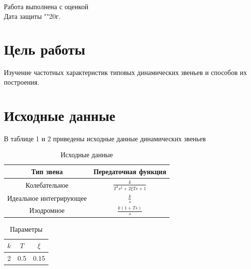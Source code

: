 \documentclass[a4paper, 12pt]{article}
\begin{document}
\begin{titlepage}
		Работа выполнена с оценкой \hspace{0.5cm} \underline{\hspace{10cm}} \\ 
		\vspace{1cm}
		Дата защиты "\underline{\hspace{0.4cm}}"\hspace{0.1cm}\underline{\hspace{1.5cm}}\hspace{0.1cm}20\underline{\hspace{0.4cm}}г.
		
	\end{titlepage}

\section*{Цель работы}
Изучение частотных характеристик типовых динамических звеньев и способов их построения.

\section*{Исходные данные}
В таблице 1 и 2 приведены исходные данные динамических звеньев 

\begin{table}[h!]
	\caption{Исходные данные}
	\label{data1}
	\begin{tabular}{|c|c|}
		\hline
		Тип звена & Передаточная функция\\
		\hline
		Колебательное & $\frac{k}{T^2s^2 + 2\xi Ts + 1}$\\
		\hline
		Идеальное интегрирующее & $\frac{k}{s}$\\
		\hline
		Изодромное & $\frac{k(1+Ts)}{s}$\\
		\hline
	\end{tabular}
\end{table}

\begin{table}[h!]

	\label{data2}
	\caption{Параметры}
	\begin{tabular}{|c|c|c|}
		\hline
		$k$ & $T$ & $\xi$ \\
		\hline
		2 & 0.5 & 0.15\\
		\hline
	\end{tabular}

\end{table}
		
\newpage		
		
\end{document}
